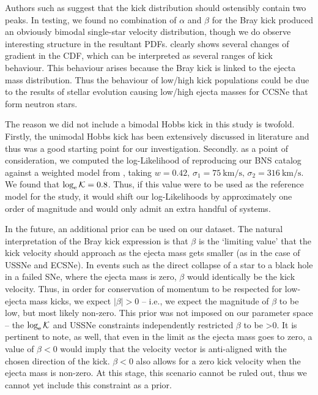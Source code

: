 Authors such as \citet{Fryer:1998, Arzoumanian:2002, Bombaci:2004} suggest that the kick distribution should ostensibly contain two peaks. In testing, we found no combination of $\alpha$ and $\beta$ for the Bray kick produced an obviously bimodal single-star velocity distribution, though we do observe interesting structure in the resultant PDFs.  clearly shows several changes of gradient in the CDF, which can be interpreted as several ranges of kick behaviour. This behaviour arises because the Bray kick is linked to the ejecta mass distribution. Thus the behaviour of low/high kick populations could be due to the results of stellar evolution causing low/high ejecta masses for CCSNe that form neutron stars. %

The reason we did not include a bimodal Hobbs kick in this study is twofold. Firstly, the unimodal Hobbs kick has been extensively discussed in literature \citep[see, among others,][]{Nakar:2007, Belczynski:2008, Lorimer:2008, Dominik:2012, Bray:2016, Eldridge:2017, Bray:2018} and thus was a good starting point for our investigation. Secondly. as a point of consideration, we computed the log-Likelihood of reproducing our BNS catalog against a weighted model from \citet{Verbunt:2017}, taking $w=0.42,\,\sigma_1=\SI{75}{\kilo\meter\per\second},\,\sigma_2=\SI{316}{\kilo\meter\per\second}$. We found that $\loge\mathcal{K} = 0.8$. Thus, if this value were to be used as the reference model for the study, it would shift our log-Likelihoods by approximately one order of magnitude and would only admit an extra handful of systems.

In the future, an additional prior can be used on our dataset. The natural interpretation of the Bray kick expression is that $\beta$ is the `limiting value' that the kick velocity should approach as the ejecta mass gets smaller (as in the case of USSNe and ECSNe). In events such as the direct collapse of a star to a black hole in a failed SNe, where the ejecta mass is zero, $\beta$ would identically be the kick velocity. Thus, in order for conservation of momentum to be respected for low-ejecta mass kicks, we expect $\left|\beta\right|>0$ -- i.e., we expect the magnitude of $\beta$ to be low, but most likely non-zero. This prior was not imposed on our parameter space -- the $\loge\mathcal{K}$ and USSNe constraints independently restricted $\beta$ to be >0. It is pertinent to note, as well, that even in the limit as the ejecta mass goes to zero, a value of $\beta<0$ would imply that the velocity vector is anti-aligned with the chosen direction of the kick. $\beta<0$ also allows for a zero kick velocity when the ejecta mass is non-zero. At this stage, this scenario cannot be ruled out, thus we cannot yet include this constraint as a prior.

